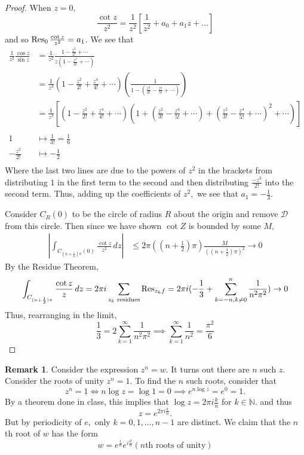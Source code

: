 \documentclass[10pt, oneside]{article}
\newcommand{\bbN}{\mathbb{N}}
\theoremstyle{definition}
\newtheorem{rem}{Remark}
\begin{document}
\begin{proof}
    When $z = 0,$ 
    \[\frac{\cot z}{z^2} = \frac{1}{z^2}\left[\frac{1}{z^2} + a_0 + a_1z + \dots\right]\] and so $\Res_0 \frac{\cot z}{z^2} = a_1$. We see that 
    \begin{align*}
        \frac{1}{z^2}\frac{\cos z}{\sin z} &= \frac{1}{z^2}\frac{1 - \frac{z^2}{2!} + \cdots}{z(1 - \frac{z^2}{3!} + \cdots)}\\
        &= \frac{1}{z^3}(1 - \frac{z^2}{2!} + \frac{z^4}{4!} + \cdots)\left(\frac{1}{1 - (\frac{z^2}{3!} - \frac{z^4}{5!}+\cdots)}\right) \\
        &= \frac{1}{z^3}\left[(1 - \frac{z^2}{2!} + \frac{z^4}{4!} + \cdots)(1 + (\frac{z^2}{3!} - \frac{z^4}{5!}+\cdots)+ (\frac{z^2}{3!} - \frac{z^4}{5!}+\cdots)^2 + \cdots)\right]\\
        \\
        1&\mapsto \frac{1}{3!} = \frac{1}{6}\\
        -\frac{z^2}{2!}&\mapsto -\frac{1}{2}\\
    \end{align*}
    Where the last two lines are due to the powers of $z^2$ in the brackets from distributing $1$ in the first term to the second and then distributing $\frac{-z^2}{2!}$ into the second term. Thus, adding up the coefficients of $z^2,$ we see that $a_1 = -\frac{1}{3}.$

    Consider $C_R(0)$ to be the circle of radius $R$ about the origin and remove $\mathcal{D}$ from this circle. Then since we have shown $\cot Z$ is bounded by some $M,$
    \begin{align*}
        |\int_{C_{(n + \frac{1}{2})\pi}(0)}\frac{\cot z}{z^2}\,dz| &\leq 2\pi ((n + \frac{1}{2})\pi) \frac{M}{((n + \frac{1}{2})\pi)^2} \to 0
    \end{align*}
    By the Residue Theorem, 
    \[\int_{C_{(n + \frac{1}{2})\pi}} \frac{\cot z}{z}\,dz = 2\pi i\sum_{\text{$z_k$ residues}}\Res_{z_k f} = 2\pi i (-\frac{1}{3} + \sum_{k=-n, k\neq 0}^n \frac{1}{n^2 \pi ^2}) \to 0\] Thus, rearranging in the limit,
    \[\frac{1}{3}= 2\sum_{k=1}^\infty \frac{1}{n^2 \pi^2} \implies \sum_{k=1}^\infty \frac{1}{n^2} = \frac{\pi^2}{6}\]
\end{proof}

\begin{rem}
    Consider the expression $z^n  = w.$ It turns out there are $n$ such $z.$ Consider the roots of unity $z^n = 1.$ To find the $n$ such roots, consider that 
    \[z^n =1 \iff n\log z = \log 1 = 0 \implies e^{n\log z} = e^0 = 1.\]By a theorem done in class, this implies that $\log z = 2\pi i \frac{k}{n}$ for $k \in \bbN.$ and thus 
    \[z = e^{2\pi i \frac{k}{n}}.\] But by periodicity of $e,$ only $k = 0, 1, \dots, n-1$ are distinct. We claim that the $n$th root of $w$ has the form 
    \[w = e^{\frac{1}{n}} e^{i\frac{\rho}{n}}(\text{$n$th roots of unity})\]
\end{rem}
\end{document}
